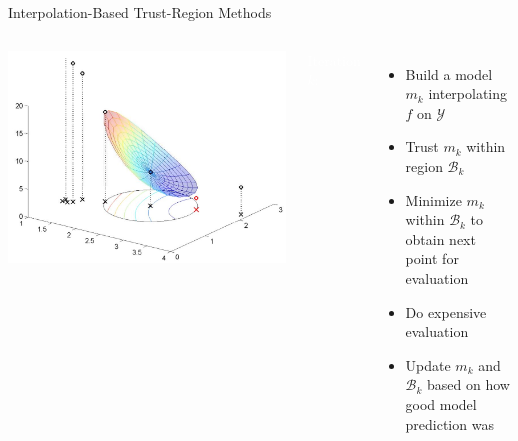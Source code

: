 \documentclass[handout,aspectratio=54]{beamer}
\numberwithin{theorem}{section}
\begin{document}
\begin{frame}{Interpolation-Based Trust-Region Methods}
\begin{columns}
\includegraphics[width=\textwidth]{fig/25-1.jpg}

\colorbox[rgb]{0.5,0.6,0.7}{\textcolor{white}{Iteration $k$:}}
\begin{itemize}\small
\item  Build a model $m_k$ interpolating $f$ on $\mathcal{Y}$
\item Trust $m_k$ within region $\mathcal{B}_k$
\item Minimize $m_k$ within $\mathcal{B}_k$ to obtain next point for evaluation
\item Do expensive evaluation
\item Update $m_k$ and $\mathcal{B}_k$ based on how good model prediction was
\end{itemize}
\end{columns}
\end{frame}
\end{document}
